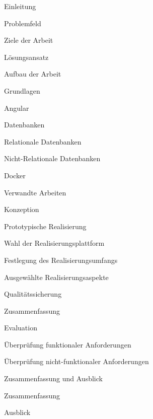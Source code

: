 \documentclass[11pt]{scrartcl}
\begin{document}
	\begin{gliederung}
		\item Einleitung
		\begin{gliederung}
			\item Problemfeld
			\item Ziele der Arbeit
			\item Lösungsansatz
			\item Aufbau der Arbeit
		\end{gliederung}
		
        \item Grundlagen
		\begin{gliederung}
            \item Angular
            \item Datenbanken
            \begin{gliederung}
                \item Relationale Datenbanken
                \item Nicht-Relationale Datenbanken
            \end{gliederung}
            \item Docker
        \end{gliederung}

		\item Verwandte Arbeiten
		
		\item Konzeption
		
		\item Prototypische Realisierung
		\begin{gliederung}
			\item Wahl der Realisierungsplattform
			\item Festlegung des Realisierungsumfangs
			\item Ausgewählte Realisierungsaspekte
			
			\item Qualitätssicherung
			\item Zusammenfassung
		\end{gliederung}
		
		\item Evaluation
		\begin{gliederung}
			\item Überprüfung funktionaler Anforderungen
			\item Überprüfung nicht-funktionaler Anforderungen
		\end{gliederung}
		
		\item Zusammenfassung und Ausblick
		\begin{gliederung}
			\item Zusammenfassung
			\item Ausblick
		\end{gliederung}
		
	\end{gliederung}
	
\end{document}

